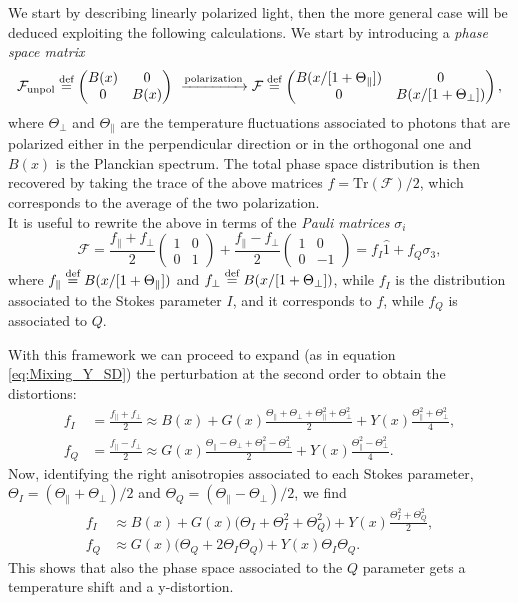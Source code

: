 We start by describing linearly polarized light, then the more general case will be deduced exploiting the following calculations. We start by introducing a \emph{phase space matrix}
\begin{equation}
    \label{eq:Pol_Occup_Matrix}
    \mathcal{F} _\text{unpol} \stackrel{\text{def}}{=}
    \begin{pmatrix}
        B(x) & 0 \\ 0 & B(x)
    \end{pmatrix}\ \xrightarrow{\text{polarization}}\mathcal{F}  \stackrel{\text{def}}{=}
    \begin{pmatrix}
        B(x/[1+\Theta_\parallel]) & 0 \\ 0 & B(x/[1+\Theta_\perp ])
    \end{pmatrix},
\end{equation}
where $\Theta_\perp$ and $\Theta_\parallel$ are the temperature fluctuations associated to photons that are polarized either in the perpendicular direction or in the orthogonal one and $B(x)$ is the Planckian spectrum. The total phase space distribution is then recovered by taking the trace of the above matrices $f=\text{Tr}(\mathcal{F} )/2$, which corresponds to the average of the two polarization.\\
It is useful to rewrite the above in terms of the \emph{ Pauli matrices} $\sigma_i$
$$\mathcal{F} =\frac{f_\parallel+f_\perp}{2}\begin{pmatrix}
    1&0\\0&1
\end{pmatrix}+\frac{f_\parallel-f_\perp}{2}\begin{pmatrix}
    1&0\\0&-1
\end{pmatrix}=f_I\hat 1+f_Q\sigma_3, $$
where $f_\parallel\stackrel{\text{def}}{=} B(x/[1+\Theta_\parallel])$ and $f_\perp\stackrel{\text{def}}{=} B(x/[1+\Theta_\perp])$, while $f_I$ is the distribution associated to the Stokes parameter $I$, and it corresponds to $f$, while $f_Q$ is associated to $Q$.

With this framework we can proceed to expand (as in equation \ref{eq:Mixing_Y_SD}) the perturbation at the second order to obtain the distortions:
\begin{align*}
    f_I&=\frac{f_\parallel+f_\perp}{2}\approx B(x)+G(x)\frac{\Theta_\parallel+\Theta_\perp+\Theta^2_\parallel+\Theta^2_\perp}{2}+Y(x)\frac{\Theta^2_\parallel+\Theta^2_\perp}{4},\\
    f_Q&=\frac{f_\parallel-f_\perp}{2}\approx G(x)\frac{\Theta_\parallel-\Theta_\perp+\Theta^2_\parallel-\Theta^2_\perp}{2}+Y(x)\frac{\Theta^2_\parallel-\Theta^2_\perp}{4}.
\end{align*}
Now, identifying the right anisotropies associated to each Stokes parameter, $\Theta_I=(\Theta_\parallel+\Theta_\perp)/2$ and $\Theta_Q=(\Theta_\parallel-\Theta_\perp)/2$, we find
\begin{align*}
    f_I&\approx B(x)+G(x)\bigg(\Theta_I+\Theta^2_I+\Theta^2_Q\bigg)+Y(x)\frac{\Theta^2_I+\Theta^2_Q}{2},\\
    f_Q&\approx G(x)\bigg(\Theta_Q+2\Theta_I\Theta_Q\bigg)+Y(x)\Theta_I\Theta_Q.
\end{align*}
This shows that also the phase space associated to the $Q$ parameter gets a temperature shift and a y-distortion.

